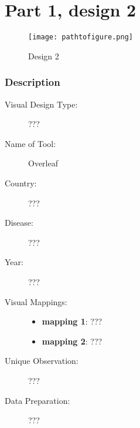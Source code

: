 \hypertarget{part-1-design-2}{%
\section{Part 1, design 2}\label{part-1-design-2}}

\begin{figure}
\centering
\texttt{[image: pathtofigure.png]}
\caption{Design 2}
\end{figure}

\hypertarget{description}{%
\subsubsection{Description}\label{description}}

\begin{description}
\item[Visual Design Type:]
???
\item[Name of Tool:]
Overleaf
\item[Country:]
???
\item[Disease:]
???
\item[Year:]
???
\item[Visual Mappings:]
\begin{itemize}
\tightlist
\item
  \textbf{mapping 1}: ???
\end{itemize}

\begin{itemize}
\tightlist
\item
  \textbf{mapping 2}: ???
\end{itemize}
\item[Unique Observation:]
???
\item[Data Preparation:]
???
\end{description}
